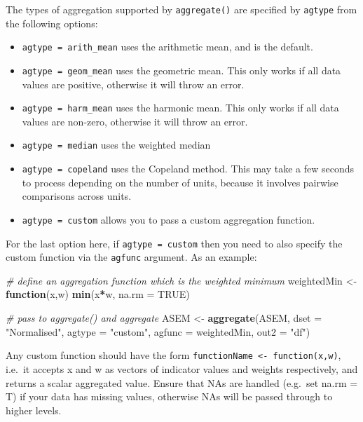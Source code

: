 \documentclass[
]{book}
\newenvironment{Shaded}{\begin{snugshade}}{\end{snugshade}}
\newcommand{\CommentTok}[1]{\textcolor[rgb]{0.56,0.35,0.01}{\textit{#1}}}
\newcommand{\ControlFlowTok}[1]{\textcolor[rgb]{0.13,0.29,0.53}{\textbf{#1}}}
\newcommand{\DataTypeTok}[1]{\textcolor[rgb]{0.13,0.29,0.53}{#1}}
\newcommand{\KeywordTok}[1]{\textcolor[rgb]{0.13,0.29,0.53}{\textbf{#1}}}
\newcommand{\NormalTok}[1]{#1}
\newcommand{\OperatorTok}[1]{\textcolor[rgb]{0.81,0.36,0.00}{\textbf{#1}}}
\newcommand{\OtherTok}[1]{\textcolor[rgb]{0.56,0.35,0.01}{#1}}
\newcommand{\StringTok}[1]{\textcolor[rgb]{0.31,0.60,0.02}{#1}}
\providecommand{\tightlist}{%
  \setlength{\itemsep}{0pt}\setlength{\parskip}{0pt}}
\begin{document}
The types of aggregation supported by \texttt{aggregate()} are specified by \texttt{agtype} from the following options:

\begin{itemize}
\tightlist
\item
  \texttt{agtype\ =\ arith\_mean} uses the arithmetic mean, and is the default.
\item
  \texttt{agtype\ =\ geom\_mean} uses the geometric mean. This only works if all data values are positive, otherwise it will throw an error.
\item
  \texttt{agtype\ =\ harm\_mean} uses the harmonic mean. This only works if all data values are non-zero, otherwise it will throw an error.
\item
  \texttt{agtype\ =\ median} uses the weighted median
\item
  \texttt{agtype\ =\ copeland} uses the Copeland method. This may take a few seconds to process depending on the number of units, because it involves pairwise comparisons across units.
\item
  \texttt{agtype\ =\ custom} allows you to pass a custom aggregation function.
\end{itemize}

For the last option here, if \texttt{agtype\ =\ custom} then you need to also specify the custom function via the \texttt{agfunc} argument. As an example:

\begin{Shaded}
\begin{Highlighting}[]
\CommentTok{# define an aggregation function which is the weighted minimum}
\NormalTok{weightedMin <-}\StringTok{ }\ControlFlowTok{function}\NormalTok{(x,w) }\KeywordTok{min}\NormalTok{(x}\OperatorTok{*}\NormalTok{w, }\DataTypeTok{na.rm =} \OtherTok{TRUE}\NormalTok{)}

\CommentTok{# pass to aggregate() and aggregate}
\NormalTok{ASEM <-}\StringTok{ }\KeywordTok{aggregate}\NormalTok{(ASEM, }\DataTypeTok{dset =} \StringTok{"Normalised"}\NormalTok{, }\DataTypeTok{agtype =} \StringTok{"custom"}\NormalTok{,}
                  \DataTypeTok{agfunc =}\NormalTok{ weightedMin, }\DataTypeTok{out2 =} \StringTok{"df"}\NormalTok{)}
\end{Highlighting}
\end{Shaded}

Any custom function should have the form \texttt{functionName\ \textless{}-\ function(x,w)}, i.e.~it accepts x and w as vectors of indicator values and weights respectively, and returns a scalar aggregated value. Ensure that NAs are handled (e.g.~set na.rm = T) if your data has missing values, otherwise NAs will be passed through to higher levels.
\end{document}
